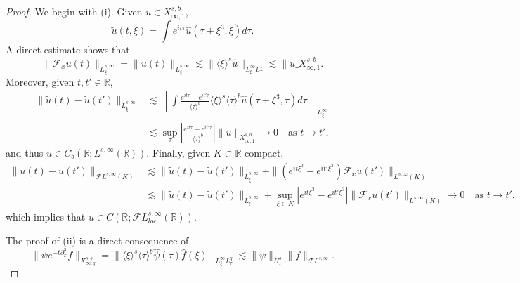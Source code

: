 \documentclass[a4paper, 11pt]{amsart}
\newcommand{\R}{\mathbb{R}}
\newcommand{\jap}[1]{\langle #1 \rangle}
\theoremstyle{plain}
\theoremstyle{definition}
\theoremstyle{remark}
\newcommand{\5}{\text{V}}
\newcommand{\noi}{\noindent}
\numberwithin{equation}{section}
\theoremstyle{mytheoremstyle} \newtheorem{nota}[thm]{Remark}
\theoremstyle{mytheoremstyle} \newtheorem{exemplo}[thm]{Example}
\begin{document}
\begin{proof}

We begin with (i). Given $u\in X^{s,b}_{\infty,1}$,
$$
\tilde{u}(t,\xi)=\int e^{it\tau}\hat{u}(\tau+\xi^3,\xi)d\tau.
$$
A direct estimate shows that
$$
\|\mathcal{F}_xu(t)\|_{L^{s,\infty}_\xi} = \|\tilde{u}(t)\|_{L^{s,\infty}_\xi} \lesssim \|\jap{\xi}^s\hat{u}\|_{L^\infty_\xi L^1_\tau} \lesssim \|u\_{X^{s,b}_{\infty,1}}.
$$
Moreover, given $t,t'\in\R$,
\begin{align*}
    \|\tilde{u}(t)-\tilde{u}(t')\|_{L_\xi^{s,\infty}} &\lesssim \left\|\int \frac{e^{it\tau}-e^{it'\tau}}{\jap{\tau}^b}\jap{\xi}^s\jap{\tau}^b\hat{u}(\tau+\xi^3,\tau)d\tau\right\|_{L^\infty_\xi}\\&\lesssim \sup_{\tau} \left| \frac{e^{it\tau}-e^{it'\tau}}{\jap{\tau}^b}\right| \|u\|_{X^{s,b}_{\infty,1}} \to 0 \quad \mbox{as }t\to t',
\end{align*}
and thus $\tilde{u}\in C_b(\R;L^{s,\infty}(\R))$. Finally, given $K\subset \R$ compact,
\begin{align*}
    \|u(t)-u(t')\|_{\mathcal{F}L^{s,\infty}(K)} &\lesssim \|\tilde{u}(t)-\tilde{u}(t')\|_{L^{s,\infty}_\xi} + \|(e^{it\xi^3}-e^{it'\xi^3})\mathcal{F}_xu(t')\|_{L^{s,\infty}(K)} \\&\lesssim \|\tilde{u}(t)-\tilde{u}(t')\|_{L^{s,\infty}_\xi} + \sup_{\xi\in K}\left|e^{it\xi^3}-e^{it'\xi^3}\right|\|\mathcal{F}_xu(t')\|_{L^{s,\infty}(K)} \to 0\quad \mbox{as }t\to t'.
\end{align*}
which implies that $u\in C(\R;\mathcal{F}L^{s,\infty}_{loc}(\R))$.

\textbf{}

\noi The proof of (ii) is a direct consequence of
$$
\|\psi e^{-t\partial_x^3}f\|_{X^{s,b}_{\infty,q}} = \|\jap{\xi}^s\jap{\tau}^b\hat{\psi}(\tau)\hat{f}(\xi)\|_{L^\infty_\xi L^q_\tau} \lesssim \|\psi\|_{H^b_t} \|f\|_{\mathcal{F}L^{s,\infty}}.
$$


\end{proof}
\end{document}
